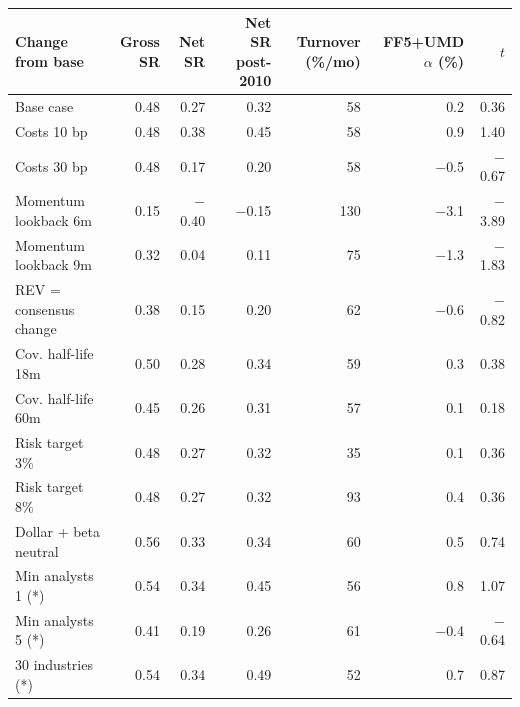 \begin{tabular}{lrrrrrr}
\toprule
Change from base & Gross SR & Net SR & Net SR post-2010 & Turnover (\%/mo) & FF5+UMD $\alpha$ (\%) & $t$ \\
\midrule
Base case & 0.48 & 0.27 & 0.32 & 58 & 0.2 & 0.36 \\
Costs 10 bp & 0.48 & 0.38 & 0.45 & 58 & 0.9 & 1.40 \\
Costs 30 bp & 0.48 & 0.17 & 0.20 & 58 & $-$0.5 & $-$0.67 \\
Momentum lookback 6m & 0.15 & $-$0.40 & $-$0.15 & 130 & $-$3.1 & $-$3.89 \\
Momentum lookback 9m & 0.32 & 0.04 & 0.11 & 75 & $-$1.3 & $-$1.83 \\
REV = consensus change & 0.38 & 0.15 & 0.20 & 62 & $-$0.6 & $-$0.82 \\
Cov. half-life 18m & 0.50 & 0.28 & 0.34 & 59 & 0.3 & 0.38 \\
Cov. half-life 60m & 0.45 & 0.26 & 0.31 & 57 & 0.1 & 0.18 \\
Risk target 3\% & 0.48 & 0.27 & 0.32 & 35 & 0.1 & 0.36 \\
Risk target 8\% & 0.48 & 0.27 & 0.32 & 93 & 0.4 & 0.36 \\
Dollar + beta neutral & 0.56 & 0.33 & 0.34 & 60 & 0.5 & 0.74 \\
Min analysts 1 (*) & 0.54 & 0.34 & 0.45 & 56 & 0.8 & 1.07 \\
Min analysts 5 (*) & 0.41 & 0.19 & 0.26 & 61 & $-$0.4 & $-$0.64 \\
30 industries (*) & 0.54 & 0.34 & 0.49 & 52 & 0.7 & 0.87 \\
\bottomrule
\end{tabular}

